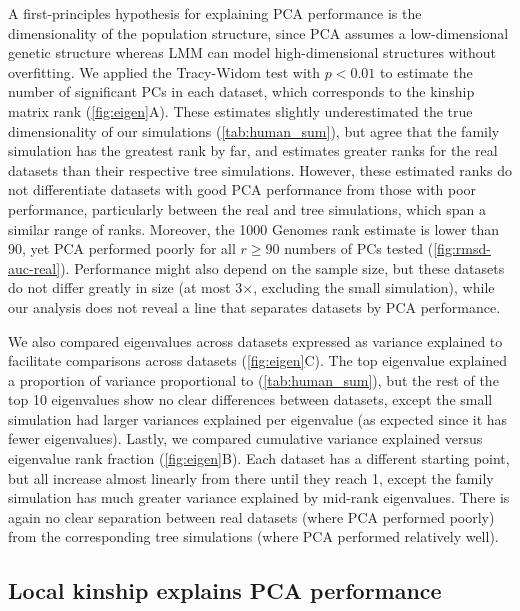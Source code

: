 \documentclass[11pt]{article}
\begin{document}
A first-principles hypothesis for explaining PCA performance is the dimensionality of the population structure, since PCA assumes a low-dimensional genetic structure whereas LMM can model high-dimensional structures without overfitting.
We applied the Tracy-Widom test \citep{patterson_population_2006} with $p < 0.01$ to estimate the number of significant PCs in each dataset, which corresponds to the kinship matrix rank (\cref{fig:eigen}A).
These estimates slightly underestimated the true dimensionality of our simulations (\cref{tab:human_sum}), but agree that the family simulation has the greatest rank by far, and estimates greater ranks for the real datasets than their respective tree simulations.
However, these estimated ranks do not differentiate datasets with good PCA performance from those with poor performance, particularly between the real and tree simulations, which span a similar range of ranks.
Moreover, the 1000 Genomes rank estimate is lower than 90, yet PCA performed poorly for all $r \ge 90$ numbers of PCs tested (\cref{fig:rmsd-auc-real}).
Performance might also depend on the sample size, but these datasets do not differ greatly in size (at most 3$\times$, excluding the small simulation), while our analysis does not reveal a line that separates datasets by PCA performance.

We also compared eigenvalues across datasets expressed as variance explained to facilitate comparisons across datasets (\cref{fig:eigen}C).
The top eigenvalue explained a proportion of variance proportional to \Fst (\cref{tab:human_sum}), but the rest of the top 10 eigenvalues show no clear differences between datasets, except the small simulation had larger variances explained per eigenvalue (as expected since it has fewer eigenvalues).
Lastly, we compared cumulative variance explained versus eigenvalue rank fraction (\cref{fig:eigen}B).
Each dataset has a different starting point, but all increase almost linearly from there until they reach 1, except the family simulation has much greater variance explained by mid-rank eigenvalues.
There is again no clear separation between real datasets (where PCA performed poorly) from the corresponding tree simulations (where PCA performed relatively well).

\subsection{Local kinship explains PCA performance}
\end{document}
